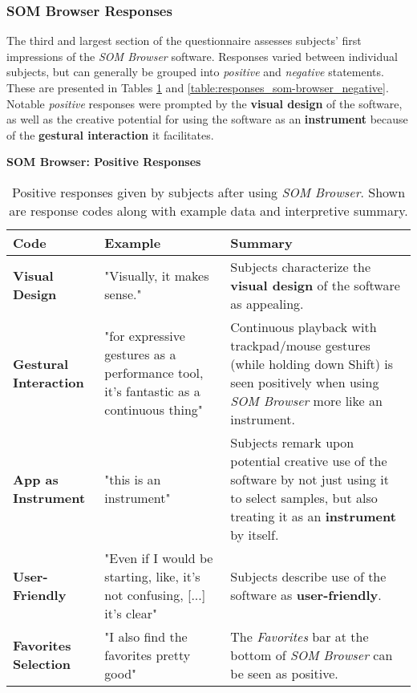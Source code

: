 \pagebreak



\subsubsection{SOM Browser Responses}
\label{subsubsec:results_som-browser_responses}
The third and largest section of the questionnaire assesses subjects' first
impressions of the \textit{SOM Browser} software. Responses varied between
individual subjects, but can generally be grouped into \textit{positive} and
\textit{negative} statements. These are presented in Tables
\ref{table:responses_som-browser_positive} and
\ref{table:responses_som-browser_negative}. Notable \textit{positive} responses
were prompted by the \textbf{visual design} of the software, as well as the
creative potential for using the software as an \textbf{instrument} because of
the \textbf{gestural interaction} it facilitates.

\begin{table}[!htb]
  \renewcommand{\arraystretch}{1.2}
  \centering
  \textbf{SOM Browser: Positive Responses} \\ [3mm]
  \footnotesize
  \colorbox{light-bg}{
  \begin{tabular}{ p{4.0cm} p{4.75cm} p{4.75cm} }
  \hline
    \textbf{Code} & \textbf{Example} & \textbf{Summary} \\
    \hline
    \textbf{Visual Design}
    &
    "Visually, it makes sense."
    &
    Subjects characterize the \textbf{visual design} of the software as
    appealing.
    \\
    \textbf{Gestural Interaction}
    &
    "for expressive gestures as a performance tool, it’s fantastic as a
    continuous thing"
    &
    Continuous playback with trackpad/mouse gestures (while holding down Shift)
    is seen positively when using \textit{SOM Browser} more like an instrument.
    \\
    \textbf{App as Instrument}
    &
    "this is an instrument"
    &
    Subjects remark upon potential creative use of the software by not just
    using it to select samples, but also treating it as an \textbf{instrument}
    by itself.
    \\
    \textbf{User-Friendly}
    &
    "Even if I would be starting, like, it's not confusing, [...] it’s clear"
    &
    Subjects describe use of the software as \textbf{user-friendly}.
    \\
    \textbf{Favorites Selection}
    &
    "I also find the favorites pretty good"
    &
    The \textit{Favorites} bar at the bottom of \textit{SOM Browser} can be seen
    as positive.
    \\
  \end{tabular}}
  \caption[\textit{SOM Browser}: Positive Responses]{Positive responses given
  by subjects after using \textit{SOM Browser}. Shown are response codes along
  with example data and interpretive summary.}
  \label{table:responses_som-browser_positive}
\end{table}

